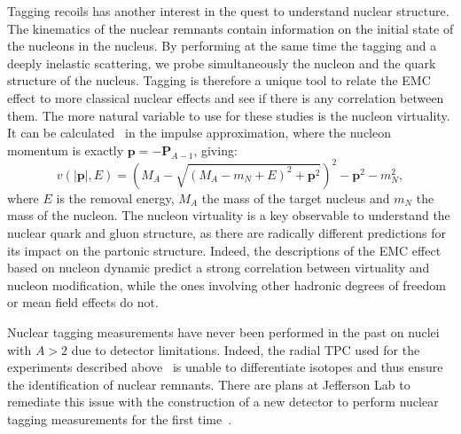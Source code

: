 Tagging recoils has another interest in the quest to understand nuclear structure.
The kinematics of the nuclear remnants contain information on the
initial state of the nucleons in the nucleus. By performing at the same time the 
tagging and a deeply inelastic scattering, we probe simultaneously the nucleon and the 
quark structure of the nucleus. Tagging is therefore a unique tool to relate the EMC
effect to more classical nuclear effects and see if there is any correlation between
them. The more natural variable to use for these studies is the nucleon virtuality.
It can be calculated~\cite{CiofidegliAtti:2007ork} in the impulse 
approximation, where the nucleon momentum is exactly $\mathbf{p} = -\mathbf{P}_{A-1}$, 
giving:
\begin{equation}
v(|\mathbf{p}|, E) = \left (M_A - \sqrt{(M_A - m_N + E)^2 + \mathbf{p}^2} \right )^2 
                   - \mathbf{p}^2 - m_N^2,
\end{equation} 
where $E$ is the removal energy, $M_A$ the mass of the target nucleus
and $m_N$ the mass of the nucleon. The nucleon virtuality is a key 
observable to understand the nuclear quark and gluon structure,
as there are radically different predictions for its impact on the partonic structure.
Indeed, the descriptions of the EMC effect based on nucleon dynamic 
predict a strong correlation between virtuality and nucleon modification,
while the ones involving other hadronic degrees of 
freedom or mean field effects do not. 

Nuclear tagging measurements have never been performed in the past
on nuclei with $A>2$ due to detector limitations. Indeed, the radial TPC used 
for the experiments described above~\cite{Baillie:2011za}
is unable to differentiate isotopes and thus ensure the identification of 
nuclear remnants. There are plans at Jefferson Lab to remediate this issue
with the construction of a new detector to perform nuclear tagging measurements 
for the first time~\cite{Armstrong:2017zqr,Armstrong:2017zcm}.

